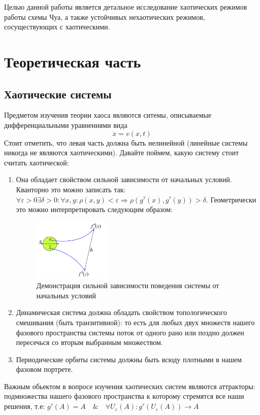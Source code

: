 \documentclass[12pt]{article}
\begin{document}
Целью данной работы является детальное исследование хаотических режимов работы схемы Чуа,
а также устойчивых нехаотических режимов, сосуществующих с хаотическими.

\section*{Теоретическая часть}
\subsection*{Хаотические системы}
Предметом изучения теории хаоса являются ситемы, описываемые дифференциальными уравнениями вида $$\ddot{x} = v(x,t)$$
Стоит отметить, что левая часть должна быть нелинейной (линейные системы никогда не являются хаотическими). Давайте поймем, какую систему стоит считать хаотической:
\begin{enumerate}
	\item Она обладает свойством сильной зависимости от начальных условий. Кванторно это можно записать так: $\forall \varepsilon > 0 \exists \delta > 0: \forall x,y :  \rho(x,y) < \varepsilon \Rightarrow \rho(g^{\tau}(x),g^{\tau}(y)) > \delta$.
			Геометрически это можно интерпретировать следующим образом:
			\begin{figure}[H]
				\centering
				\includegraphics[width=0.35\textwidth]{dependance_st_pos.png}
				\caption{Демонстрация сильной зависимости поведения системы от начальных условий}
				\label{fig:demonstrate_dependance}
			\end{figure}
	\item Динамическая система должна обладать свойством топологического смешивания (быть транзитивной): то есть для любых двух множеств нашего фазового пространства системы поток от одного рано или поздно должен пересечься со вторым выбранным множеством.
	\item Периодические орбиты системы должны быть всюду плотными в нашем фазовом портрете.
\end{enumerate}

Важным обьектом в вопросе изучения хаотических систем являются аттракторы: подмножества нашего фазового пространства к которому стремятся все наши решения, т.е:
$g^{\tau}(A) = A \quad\&\quad \forall U_{\varepsilon}(A): g^{\tau}(U_{\varepsilon}(A)) \rightarrow A$
\end{document}
